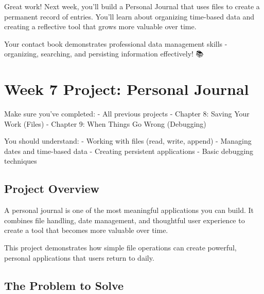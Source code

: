 \documentclass[
  letterpaper,
  DIV=11,
  numbers=noendperiod,
  oneside]{scrreprt}
\begin{document}
Great work! Next week, you'll build a Personal Journal that uses files
to create a permanent record of entries. You'll learn about organizing
time-based data and creating a reflective tool that grows more valuable
over time.

Your contact book demonstrates professional data management skills -
organizing, searching, and persisting information effectively! 📚

\chapter{Week 7 Project: Personal
Journal}\label{sec-project-journal-app}

\begin{tcolorbox}[enhanced jigsaw, opacityback=0, colback=white, colframe=quarto-callout-important-color-frame, breakable, titlerule=0mm, coltitle=black, rightrule=.15mm, colbacktitle=quarto-callout-important-color!10!white, left=2mm, bottomtitle=1mm, bottomrule=.15mm, title=\textcolor{quarto-callout-important-color}{\faExclamation}\hspace{0.5em}{Before You Start}, opacitybacktitle=0.6, toptitle=1mm, leftrule=.75mm, arc=.35mm, toprule=.15mm]

Make sure you've completed: - All previous projects - Chapter 8: Saving
Your Work (Files) - Chapter 9: When Things Go Wrong (Debugging)

You should understand: - Working with files (read, write, append) -
Managing dates and time-based data - Creating persistent applications -
Basic debugging techniques

\end{tcolorbox}

\section{Project Overview}\label{project-overview-6}

A personal journal is one of the most meaningful applications you can
build. It combines file handling, date management, and thoughtful user
experience to create a tool that becomes more valuable over time.

This project demonstrates how simple file operations can create
powerful, personal applications that users return to daily.

\section{The Problem to Solve}\label{the-problem-to-solve-6}
\end{document}
